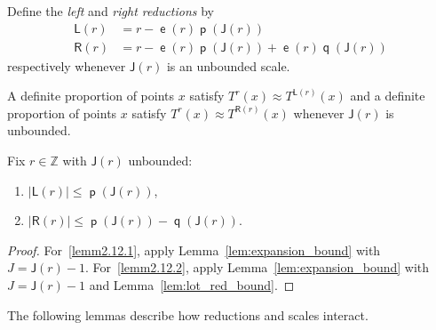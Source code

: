 \documentclass[AHL,Unicode,longabstracts,published]{cedram}
\DeclareMathOperator{\lst}{\mathsf{e}}
\DeclareMathOperator{\p}{\mathsf{p}}
\DeclareMathOperator{\q}{\mathsf{q}}
\newcommand{\Z}{\mathbb{Z}}
\newcommand{\lft}{\mathsf{L}}
\newcommand{\rht}{\mathsf{R}}
\newcommand{\scl}{\mathsf{J}}
\begin{document}
\begin{defi}\label{def:reduction}
Define the
\emph{left} and
\emph{right reductions} by
\begin{align*}
\lft(r) &= r - \lst(r) \p(\scl(r)) \\
\rht(r) &= r - \lst(r) \p(\scl(r)) + \lst(r) \q(\scl(r))
\end{align*}
respectively whenever $\scl(r)$ is an unbounded scale.
\end{defi}

A definite proportion of points $x$ satisfy $T^r(x) \approx T^{\lft(r)}(x)$ and a definite proportion of points $x$ satisfy $T^r(x) \approx T^{\rht(r)}(x)$ whenever $\scl(r)$ is unbounded.

\begin{lemm}\label{lem:need it later}
Fix $r \in \Z$ with $\scl(r)$ unbounded:
\begin{enumerate}
\item\label{lemm2.12.1} $|\lft(r)| \le \p(\scl(r))$,
\item\label{lemm2.12.2} $|\rht(r)| \le \p(\scl(r)) - \q(\scl(r))$.
\end{enumerate}
\end{lemm}
\begin{proof}
For~\eqref{lemm2.12.1}, apply Lemma~\ref{lem:expansion_bound} with $J = \scl(r) - 1$. For~\eqref{lemm2.12.2}, apply Lemma~\ref{lem:expansion_bound} with $J =
\scl(r) - 1$ and Lemma~\ref{lem:lot_red_bound}.
\end{proof}

The following lemmas describe how reductions and scales interact.
\end{document}
